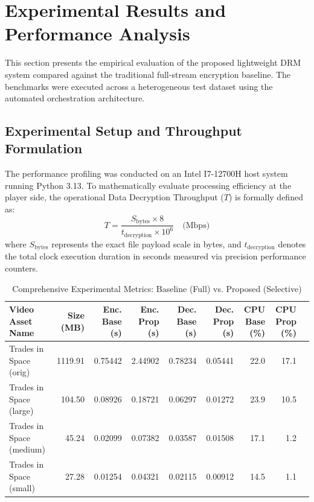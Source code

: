 \section{Experimental Results and Performance Analysis}
This section presents the empirical evaluation of the proposed lightweight DRM system compared against the traditional full-stream encryption baseline. The benchmarks were executed across a heterogeneous test dataset using the automated orchestration architecture.

\subsection{Experimental Setup and Throughput Formulation}
The performance profiling was conducted on an Intel I7-12700H host system running Python 3.13. To mathematically evaluate processing efficiency at the player side, the operational Data Decryption Throughput ($T$) is formally defined as:
\begin{equation}
T = \frac{S_{\text{bytes}} \times 8}{t_{\text{decryption}} \times 10^6} \quad \text{(Mbps)}
\end{equation}
where $S_{\text{bytes}}$ represents the exact file payload scale in bytes, and $t_{\text{decryption}}$ denotes the total clock execution duration in seconds measured via precision performance counters.

\begin{table}[t]
\caption{Comprehensive Experimental Metrics: Baseline (Full) vs. Proposed (Selective)}
\label{tab:metrics}
\begin{center}
\begin{tabular}{lrrrrrrrr}
\toprule
\textbf{Video Asset Name} & \textbf{Size (MB)} & \textbf{Enc. Base (s)} & \textbf{Enc. Prop (s)} & \textbf{Dec. Base (s)} & \textbf{Dec. Prop (s)} & \textbf{CPU Base (\%)} & \textbf{CPU Prop (\%)} \\
\midrule
Trades in Space (orig)   & 1119.91 & 0.75442 & 2.44902 & 0.78234 & 0.05441 & 22.0 & 17.1 \\
Trades in Space (large)  & 104.50  & 0.08926 & 0.18721 & 0.06297 & 0.01272 & 23.9 & 10.5 \\
Trades in Space (medium) & 45.24   & 0.02099 & 0.07382 & 0.03587 & 0.01508 & 17.1 & 1.2  \\
Trades in Space (small)  & 27.28   & 0.01254 & 0.04321 & 0.02115 & 0.00912 & 14.5 & 1.1  \\
\bottomrule
\end{tabular}
\end{center}
\end{table}

